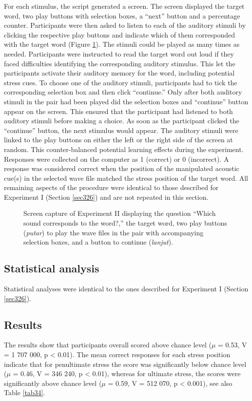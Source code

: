 For each stimulus, the script generated a screen. The screen displayed the target word, two play buttons with selection boxes, a ``next'' button and a percentage counter. Participants were then asked to listen to each of the auditory stimuli by clicking the respective play buttons and indicate which of them corresponded with the target word (Figure \ref{fig304}). The stimuli could be played as many times as needed. Participants were instructed to read the target word out loud if they faced difficulties identifying the corresponding auditory stimulus. This let the participants activate their auditory memory for the word, including potential stress cues. To choose one of the auditory stimuli, participants had to tick the corresponding selection box and then click ``continue.'' Only after both auditory stimuli in the pair had been played did the selection boxes and ``continue'' button appear on the screen. This ensured that the participant had listened to both auditory stimuli before making a choice. As soon as the participant clicked the ``continue'' button, the next stimulus would appear. The auditory stimuli were linked to the play buttons on either the left or the right side of the screen at random. This counter-balanced potential learning effects during the experiment. Responses were collected on the computer as 1 (correct) or 0 (incorrect). A response was considered correct when the position of the manipulated acoustic cue(s) in the selected wave file matched the stress position of the target word. All remaining aspects of the procedure were identical to those described for Experiment I (Section \ref{sec326}) and are not repeated in this section.

\begin{figure}

\fbox{\texttt{[image: 304]}}
\caption{Screen capture of Experiment II displaying the question ``Which
sound corresponds to the word?,'' the target word, two play buttons (\textit{putar}) to play the wave files in the pair with accompanying selection boxes, and a button to continue (\textit{lanjut}).}\label{fig304}
\end{figure}

\subsection{Statistical analysis}
Statistical analyses were identical to the ones described for Experiment I (Section \ref{sec326}).

\subsection{Results}
The results show that participants overall scored above chance level ($\mu$ = 0.53, V = 1 707 000, p < 0.01). The mean correct responses for each stress position indicate that for penultimate stress the score was significantly below chance level ($\mu$ = 0.46, V = 346 240, p < 0.01), whereas for ultimate stress, the scores were significantly above chance level ($\mu$ = 0.59, V = 512 070, p < 0.001), see also Table \ref{tab34}.

